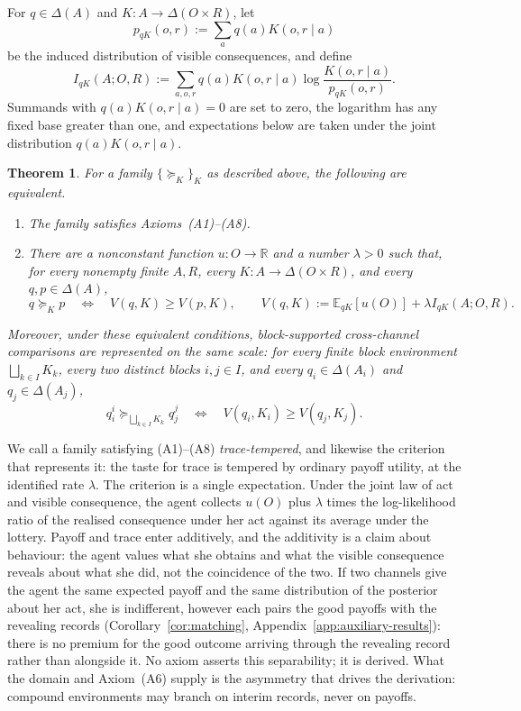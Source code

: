 \documentclass[11pt,a4paper]{article}
\newtheorem{theorem}{Theorem}
\theoremstyle{definition}
\newcommand{\D}{\Delta}
\newcommand{\E}{\mathbb E}
\newcommand{\I}{I}
\newcommand{\1}{\mathbf 1}
\begin{document}
For $q\in\D(A)$ and $K:A\to\D(O\times R)$, let
\[
 p_{qK}(o,r):=\sum_a q(a)K(o,r\mid a)
\]
be the induced distribution of visible consequences, and define
\begin{equation}
 \I_{qK}(A;O,R)
 :=\sum_{a,o,r}q(a)K(o,r\mid a)
 \log\frac{K(o,r\mid a)}{p_{qK}(o,r)}.
 \label{eq:mi}
\end{equation}
Summands with $q(a)K(o,r\mid a)=0$ are set to zero, the logarithm has any fixed base greater than one, and expectations below are
taken under the joint distribution $q(a)K(o,r\mid a)$.

\begin{theorem}\label{thm:main}
For a family $\{\succeq_K\}_K$ as described above, the following are equivalent.
\begin{enumerate}[label=\textup{(\roman*)},leftmargin=*]
\item The family satisfies Axioms~\textup{(A1)--(A8)}.
\item There are a nonconstant function $u:O\to\mathbb R$ and a number $\lambda>0$ such that, for every nonempty
finite $A,R$, every $K:A\to\D(O\times R)$, and every $q,p\in\D(A)$,
\begin{equation}
 q\succeq_Kp
 \quad\Longleftrightarrow\quad
 V(q,K)\ge V(p,K),
 \qquad
 V(q,K):=\E_{qK}[u(O)]+\lambda\I_{qK}(A;O,R).
 \label{eq:representation}
\end{equation}
\end{enumerate}
Moreover, under these equivalent conditions, block-supported cross-channel comparisons are represented on the same
scale: for every finite block environment $\bigsqcup_{k\in I}K_k$, every two distinct blocks $i,j\in I$, and every
$q_i\in\D(A_i)$ and $q_j\in\D(A_j)$,
\[
 q_i^i\succeq_{\bigsqcup_{k\in I}K_k}q_j^j
 \quad\Longleftrightarrow\quad
 V(q_i,K_i)\ge V(q_j,K_j).
\]
\end{theorem}

We call a family satisfying \textup{(A1)--(A8)} \emph{trace-tempered}, and likewise the criterion that
represents it: the taste for trace is tempered by ordinary payoff utility, at the identified rate $\lambda$.  The criterion is
a single expectation.  Under the joint law of act and visible consequence, the agent collects
$u(O)$ plus $\lambda$ times the log-likelihood ratio of the realised consequence under her act against its
average under the lottery.  Payoff and trace enter additively, and the additivity is a claim about behaviour:
the agent values what she obtains and what the visible consequence reveals about what she did, not the
coincidence of the two.  If two channels give the agent the same expected payoff and the same distribution of
the posterior about her act, she is indifferent, however each pairs the good payoffs with the revealing records
(Corollary~\ref{cor:matching}, Appendix~\ref{app:auxiliary-results}): there is no premium for the good outcome
arriving through the revealing record rather than alongside it.  No axiom asserts this separability; it is
derived.  What the domain and Axiom~\textup{(A6)} supply is the asymmetry that drives the derivation: compound
environments may branch on interim records, never on payoffs.
\end{document}
